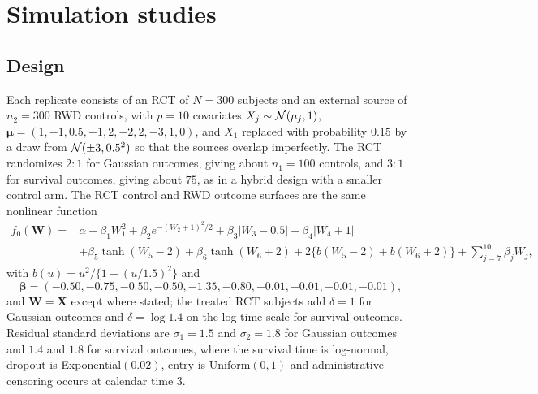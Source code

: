 
\section{Simulation studies}
\label{sec:sim}

\subsection{Design}
\label{sec:sim_design}

Each replicate consists of an RCT of $N=300$ subjects and an external source of $n_2=300$ RWD controls, with $p=10$ covariates $X_j\sim\mathcal{N}(\mu_j,1)$, $\bm\mu=(1,-1,0.5,-1,2,-2,2,-3,1,0)$, and $X_1$ replaced with probability $0.15$ by a draw from $\mathcal{N}(\pm3,0.5^2)$ so that the sources overlap imperfectly. The RCT randomizes $2{:}1$ for Gaussian outcomes, giving about $n_1=100$ controls, and $3{:}1$ for survival outcomes, giving about $75$, as in a hybrid design with a smaller control arm. The RCT control and RWD outcome surfaces are the same nonlinear function
\begin{equation}
\begin{aligned}
f_0(\bm W)={}&\alpha+\beta_1W_1^2+\beta_2e^{-(W_2+1)^2/2}+\beta_3|W_3-0.5|+\beta_4|W_4+1|\\
&+\beta_5\tanh(W_5-2)+\beta_6\tanh(W_6+2)+2\{b(W_5-2)+b(W_6+2)\}+\textstyle\sum_{j=7}^{10}\beta_jW_j,
\end{aligned}
\label{eq:dgp}
\end{equation}
with $b(u)=u^2/\{1+(u/1.5)^2\}$ and
\[
\bm\beta=(-0.50,-0.75,-0.50,-0.50,-1.35,-0.80,-0.01,-0.01,-0.01,-0.01),
\]
and $\bm W=\bm X$ except where stated; the treated RCT subjects add $\delta=1$ for Gaussian outcomes and $\delta=\log1.4$ on the log-time scale for survival outcomes. Residual standard deviations are $\sigma_1=1.5$ and $\sigma_2=1.8$ for Gaussian outcomes and $1.4$ and $1.8$ for survival outcomes, where the survival time is log-normal, dropout is Exponential$(0.02)$, entry is Uniform$(0,1)$ and administrative censoring occurs at calendar time $3$.

